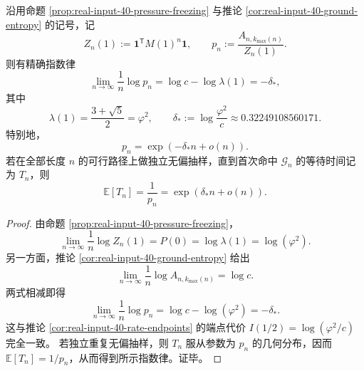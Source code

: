 \begin{theorem}\label{thm:xi-real-input-ground-layer-unbiased-rarity}
沿用命题 \ref{prop:real-input-40-pressure-freezing} 与推论 \ref{cor:real-input-40-ground-entropy} 的记号，记
\[
Z_n(1):=\mathbf{1}^{\mathsf T}M(1)^n\mathbf{1},
\qquad
p_n:=\frac{A_{n,k_{\max}(n)}}{Z_n(1)}.
\]
则有精确指数律
\[
\boxed{\;
\lim_{n\to\infty}\frac{1}{n}\log p_n
=
\log c-\log\lambda(1)
=
-\delta_\ast,
\;}
\]
其中
\[
\lambda(1)=\frac{3+\sqrt5}{2}=\varphi^2,
\qquad
\delta_\ast:=\log\frac{\varphi^2}{c}\approx 0.32249108560171.
\]
特别地，
\[
p_n=\exp(-\delta_\ast n+o(n)).
\]
若在全部长度 \(n\) 的可行路径上做独立无偏抽样，直到首次命中 \(\mathcal G_n\) 的等待时间记为 \(T_n\)，则
\[
\mathbb E[T_n]=\frac{1}{p_n}=\exp(\delta_\ast n+o(n)).
\]
\end{theorem}
\begin{proof}
由命题 \ref{prop:real-input-40-pressure-freezing}，
\[
\lim_{n\to\infty}\frac{1}{n}\log Z_n(1)=P(0)=\log\lambda(1)=\log(\varphi^2).
\]
另一方面，推论 \ref{cor:real-input-40-ground-entropy} 给出
\[
\lim_{n\to\infty}\frac{1}{n}\log A_{n,k_{\max}(n)}=\log c.
\]
两式相减即得
\[
\lim_{n\to\infty}\frac{1}{n}\log p_n
=
\log c-\log(\varphi^2)
=
-\delta_\ast.
\]
这与推论 \ref{cor:real-input-40-rate-endpoints} 的端点代价
\(
I(1/2)=\log(\varphi^2/c)
\)
完全一致。
若独立重复无偏抽样，则 \(T_n\) 服从参数为 \(p_n\) 的几何分布，因而
\(
\mathbb E[T_n]=1/p_n
\)，从而得到所示指数律。证毕。
\end{proof}

